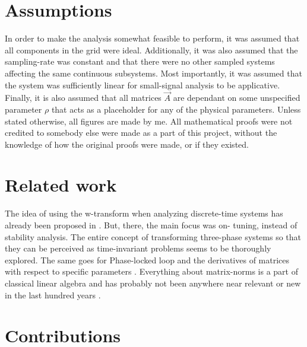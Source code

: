 \section{Assumptions}
In order to make the analysis somewhat feasible to perform, it was assumed that all components in the grid were ideal. Additionally, it was also assumed that the sampling-rate was constant and that there were no other sampled systems affecting the same continuous subsystems. Most importantly, it was assumed that the system was sufficiently linear for small-signal analysis to be applicative. Finally, it is also assumed that all matrices $\Vec{A}$ are dependant on some unspecified parameter $\rho$ that acts as a placeholder for any of the physical parameters. 
\noindent 
Unless stated otherwise, all figures are made by me. All mathematical proofs were not credited to somebody else were made as a part of this project, without the knowledge of how the original proofs were made, or if they existed. %



\section{Related work}
The idea of using the w-transform when analyzing discrete-time systems has already been proposed in \cite{Suul_paper_2}. But, there, the main focus was on- tuning, instead of stability analysis.
\noindent
The entire concept of transforming three-phase systems so that they can be perceived as time-invariant problems seems to be thoroughly explored\cite{Suul_paper_1,Suul_paper_2,eth_paper}. The same goes for Phase-locked loop \cite{Suul_paper_1, eth_paper} and the derivatives of matrices with respect to specific parameters \cite{Matrix_differentiation_source}. Everything about matrix-norms is a part of classical linear algebra and has probably not been anywhere near relevant or new in the last hundred years . 


\section{Contributions}

